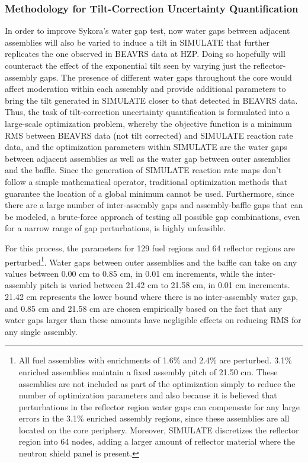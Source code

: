 \documentclass{article}
\begin{document}



\subsubsection{Methodology for Tilt-Correction Uncertainty Quantification}\label{sec:tc_uq_method}

In order to improve Sykora's water gap test, now water gaps between adjacent assemblies will also be varied to induce a tilt in SIMULATE that further replicates the one observed in BEAVRS data at HZP. Doing so hopefully will counteract the effect of the exponential tilt seen by varying just the reflector-assembly gaps. The presence of different water gaps throughout the core would affect moderation within each assembly and provide additional parameters to bring the tilt generated in SIMULATE closer to that detected in BEAVRS data. Thus, the task of tilt-correction uncertainty quantification is formulated into a large-scale optimization problem, whereby the objective function is a minimum RMS between BEAVRS data (not tilt corrected) and SIMULATE reaction rate data, and the optimization parameters within SIMULATE are the water gaps between adjacent assemblies as well as the water gap between outer assemblies and the baffle. Since the generation of SIMULATE reaction rate maps don't follow a simple mathematical operator, traditional optimization methods that guarantee the location of a global minimum cannot be used. Furthermore, since there are a large number of inter-assembly gaps and assembly-baffle gaps that can be modeled, a brute-force approach of testing all possible gap combinations, even for a narrow range of gap perturbations, is highly unfeasible.

For this process, the parameters for 129 fuel regions and 64 reflector regions are perturbed\footnote{All fuel assemblies with enrichments of 1.6\% and 2.4\% are perturbed. 3.1\% enriched assemblies maintain a fixed assembly pitch of 21.50 cm. These assemblies are not included as part of the optimization simply to reduce the number of optimization parameters and also because it is believed that perturbations in the reflector region water gaps can compensate for any large errors in the 3.1\% enriched assembly regions, since these assemblies are all located on the core periphery. Moreover, SIMULATE discretizes the reflector region into 64 nodes, adding a larger amount of reflector material where the neutron shield panel is present.}. Water gaps between outer assemblies and the baffle can take on any values between 0.00 cm to 0.85 cm, in 0.01 cm increments, while the inter-assembly pitch is varied between 21.42 cm to 21.58 cm, in 0.01 cm increments. 21.42 cm represents the lower bound where there is no inter-assembly water gap, and 0.85 cm and 21.58 cm are chosen empirically based on the fact that any water gaps larger than these amounts have negligible effects on reducing RMS for any single assembly. 
\end{document}
